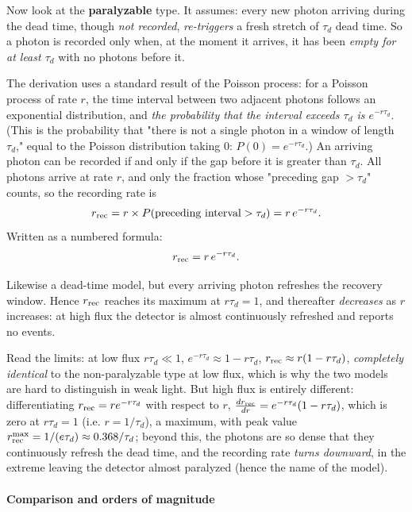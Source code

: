 Now look at the \textbf{paralyzable} type. It assumes: every new photon arriving during the dead time, though \emph{not recorded}, \emph{re-triggers} a fresh stretch of $\tau_d$ dead time. So a photon is recorded only when, at the moment it arrives, it has been \emph{empty for at least $\tau_d$} with no photons before it.

The derivation uses a standard result of the Poisson process: for a Poisson process of rate $r$, the time interval between two adjacent photons follows an exponential distribution, and \emph{the probability that the interval exceeds $\tau_d$ is $e^{-r\tau_d}$}. (This is the probability that "there is not a single photon in a window of length $\tau_d$," equal to the Poisson distribution taking 0: $P(0)=e^{-r\tau_d}$.) An arriving photon can be recorded if and only if the gap before it is greater than $\tau_d$. All photons arrive at rate $r$, and only the fraction whose "preceding gap $>\tau_d$" counts, so the recording rate is
\[
  r_{\rm rec}=r\times P(\text{preceding interval}>\tau_d)=r\,e^{-r\tau_d}.
\]
Written as a numbered formula:
\begin{equation}
  r_{\rm rec}=r\,e^{-r\tau_d}.
  \label{eq:e13-paralyzable}
\end{equation}
\begin{formulaexplain}
Likewise a dead-time model, but every arriving photon refreshes the recovery window. Hence $r_{\rm rec}$ reaches its maximum at $r\tau_d=1$, and thereafter \emph{decreases} as $r$ increases: at high flux the detector is almost continuously refreshed and reports no events.
\end{formulaexplain}
Read the limits: at low flux $r\tau_d\ll1$, $e^{-r\tau_d}\approx1-r\tau_d$, $r_{\rm rec}\approx r(1-r\tau_d)$, \emph{completely identical} to the non-paralyzable type at low flux, which is why the two models are hard to distinguish in weak light. But high flux is entirely different: differentiating $r_{\rm rec}=re^{-r\tau_d}$ with respect to $r$, $\frac{d r_{\rm rec}}{dr}=e^{-r\tau_d}(1-r\tau_d)$, which is zero at $r\tau_d=1$ (i.e. $r=1/\tau_d$), a maximum, with peak value $r_{\rm rec}^{\max}=1/(e\tau_d)\approx0.368/\tau_d$; beyond this, the photons are so dense that they continuously refresh the dead time, and the recording rate \emph{turns downward}, in the extreme leaving the detector almost paralyzed (hence the name of the model).

\paragraph{Comparison and orders of magnitude}

